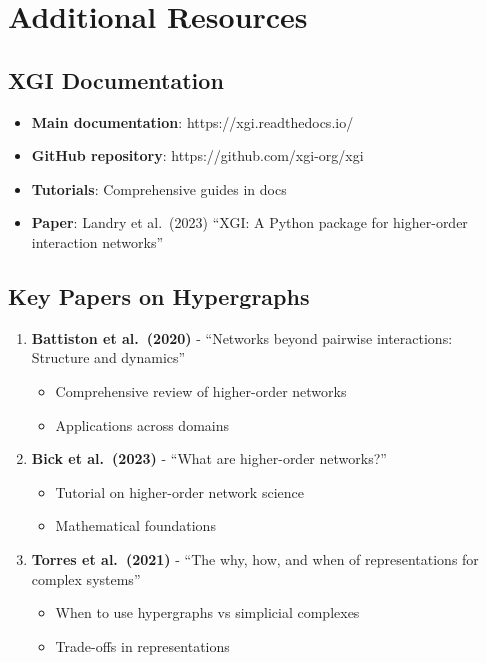 \documentclass[
  11pt,
  letterpaper,
  oneside,
  openany]{book}
\providecommand{\tightlist}{%
  \setlength{\itemsep}{0pt}\setlength{\parskip}{0pt}}
\begin{document}
\section{Additional Resources}\label{additional-resources-2}

\subsection{XGI Documentation}\label{xgi-documentation}

\begin{itemize}
\tightlist
\item
  \textbf{Main documentation}: https://xgi.readthedocs.io/
\item
  \textbf{GitHub repository}: https://github.com/xgi-org/xgi
\item
  \textbf{Tutorials}: Comprehensive guides in docs
\item
  \textbf{Paper}: Landry et al.~(2023) ``XGI: A Python package for
  higher-order interaction networks''
\end{itemize}

\subsection{Key Papers on Hypergraphs}\label{key-papers-on-hypergraphs}

\begin{enumerate}
\def\labelenumi{\arabic{enumi}.}
\tightlist
\item
  \textbf{Battiston et al.~(2020)} - ``Networks beyond pairwise
  interactions: Structure and dynamics''

  \begin{itemize}
  \tightlist
  \item
    Comprehensive review of higher-order networks
  \item
    Applications across domains
  \end{itemize}
\item
  \textbf{Bick et al.~(2023)} - ``What are higher-order networks?''

  \begin{itemize}
  \tightlist
  \item
    Tutorial on higher-order network science
  \item
    Mathematical foundations
  \end{itemize}
\item
  \textbf{Torres et al.~(2021)} - ``The why, how, and when of
  representations for complex systems''

  \begin{itemize}
  \tightlist
  \item
    When to use hypergraphs vs simplicial complexes
  \item
    Trade-offs in representations
  \end{itemize}
\end{enumerate}
\end{document}
